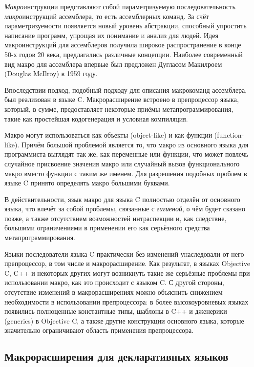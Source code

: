 \textit{Макро}инструкции представляют собой параметризуемую последовательность \textit{микро}инструкций ассемблера, то есть ассемблерных команд. За счёт параметризуемости появляется новый уровень абстракции, способный упростить написание программ, упрощая их понимание и анализ для людей. Идея макроинструкций для ассемблеров получила широкое распространение в конце 50-х годов 20 века, предлагались различные концепции\cite{share_709_system}. Наиболее современный вид макро для ассемблера впервые был предложен Дугласом Макилроем (Douglas McIlroy) в 1959 году\cite{McIlroy:1960:MIE:367177.367223}.

Впоследствии подход, подобный подходу для описания макрокоманд ассемблера, был реализован в языке C\cite{c_preprocessor_macros}. Макрорасширение встроено в препроцессор языка, который, в сумме, предоставляет некоторые приёмы метапрограммирования, такие как простейшая кодогенерация и условная компиляция. 

Макро могут использоваться как объекты (object-like) и как функции (function-like). Причём большой проблемой является то, что макро из основного языка для программиста выглядят так же, как переменные или функции, что может повлечь случайное присвоение значения макро или случайный вызов функционального макро вместо функции с таким же именем. Для разрешения подобных проблем в языке C принято определять макро большими буквами.

В действительности, язык макро для языка C полностью отделён от основного языка, что влечёт за собой проблемы, связанные с \textit{гигиеной}, о чём будет сказано позже, а также отсутствием возможностей интраспекции и, как следствие, большими ограничениями в применении его как серьёзного средства метапрограммирования.

Языки-последователи языка C практически без изменений унаследовали от него препроцессор, в том числе и макрорасширение. Как результат, в языках Objective C, C++ и некоторых других могут возникнуть такие же серьёзные проблемы при использовании макро, как это происходит с языком C. С другой стороны, отсутствие изменений в макрорасширениях можно объяснить снижением необходимости в использовании препроцессора: в более высокоуровневых языках появились полноценные константные типы, шаблоны в C++ и дженерики (generics) в Objective C, а также другие конструкции основного языка, которые значительно ограничивают область применения препроцессора.

\subsection{Макрорасширения для декларативных языков}


